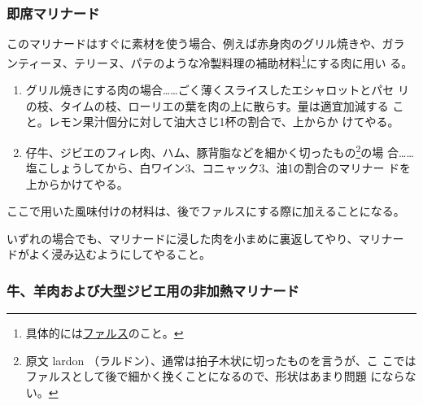 \begin{recette}
\hypertarget{marinade-instantanee}{%
\subsubsection{即席マリナード}\label{marinade-instantanee}}



このマリナードはすぐに素材を使う場合、例えば赤身肉のグリル焼きや、ガラ
ンティーヌ、テリーヌ、パテのような冷製料理の補助材料\footnote{具体的には\protect\hyperlink{farces}{ファルス}のこと。}にする肉に用い
る。

\begin{enumerate}
\def\labelenumi{\arabic{enumi}.}
\item
  グリル焼きにする肉の場合\ldots{}\ldots{}ごく薄くスライスしたエシャロットとパセ
  リの枝、タイムの枝、ローリエの葉を肉の上に散らす。量は適宜加減する
  こと。レモン果汁\undemi{}個分に対して油大さじ1杯の割合で、上からか
  けてやる。
\item
  仔牛、ジビエのフィレ肉、ハム、豚背脂などを細かく切ったもの\footnote{原文
    lardon （ラルドン）、通常は拍子木状に切ったものを言うが、こ
    こではファルスとして後で細かく挽くことになるので、形状はあまり問題
    にならない。}の場
  合\ldots{}\ldots{}塩こしょうしてから、白ワイン3、コニャック3、油1の割合のマリナー
  ドを上からかけてやる。
\end{enumerate}

ここで用いた風味付けの材料は、後でファルスにする際に加えることになる。

いずれの場合でも、マリナードに浸した肉を小まめに裏返してやり、マリナー
ドがよく浸み込むようにしてやること。

\maeaki

\hypertarget{marinade-crue-pour-viandes-de-boucherie-ou-venaison}{%
\subsubsection{牛、羊肉および大型ジビエ用の非加熱マリナード}\label{marinade-crue-pour-viandes-de-boucherie-ou-venaison}}




\end{recette}

